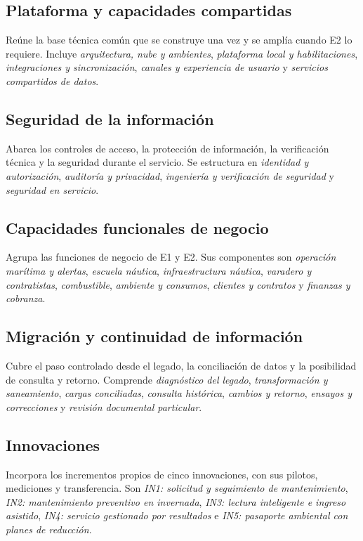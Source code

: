 \subsection{Plataforma y capacidades compartidas}
Reúne la base técnica común que se construye una vez y se amplía cuando E2 lo
requiere. Incluye \emph{arquitectura, nube y ambientes}, \emph{plataforma local
y habilitaciones}, \emph{integraciones y sincronización}, \emph{canales y
experiencia de usuario} y \emph{servicios compartidos de datos}.

\subsection{Seguridad de la información}
Abarca los controles de acceso, la protección de información, la verificación
técnica y la seguridad durante el servicio. Se estructura en \emph{identidad y
autorización}, \emph{auditoría y privacidad}, \emph{ingeniería y verificación de
seguridad} y \emph{seguridad en servicio}.

\subsection{Capacidades funcionales de negocio}
Agrupa las funciones de negocio de E1 y E2. Sus componentes son \emph{operación
marítima y alertas}, \emph{escuela náutica}, \emph{infraestructura náutica},
\emph{varadero y contratistas}, \emph{combustible}, \emph{ambiente y consumos},
\emph{clientes y contratos} y \emph{finanzas y cobranza}.

\subsection{Migración y continuidad de información}
Cubre el paso controlado desde el legado, la conciliación de datos y la
posibilidad de consulta y retorno. Comprende \emph{diagnóstico del legado},
\emph{transformación y saneamiento}, \emph{cargas conciliadas}, \emph{consulta
histórica}, \emph{cambios y retorno}, \emph{ensayos y correcciones} y
\emph{revisión documental particular}.

\subsection{Innovaciones}
Incorpora los incrementos propios de cinco innovaciones, con sus pilotos,
mediciones y transferencia. Son \emph{IN1: solicitud y seguimiento de
mantenimiento}, \emph{IN2: mantenimiento preventivo en invernada}, \emph{IN3:
lectura inteligente e ingreso asistido}, \emph{IN4: servicio gestionado por
resultados} e \emph{IN5: pasaporte ambiental con planes de reducción}.

